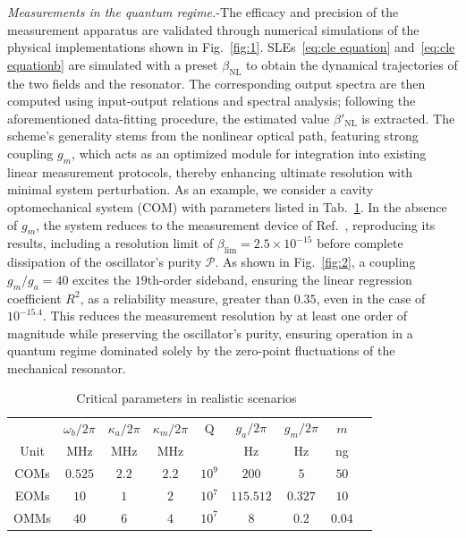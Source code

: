 \documentclass[aps,prl,twocolumn,superscriptaddress]{revtex4-2}
\begin{document}
\textit{Measurements in the quantum regime.}-The efficacy and precision of the measurement apparatus are validated through numerical simulations of the physical implementations shown in Fig.~\ref{fig:1}.  SLEs~\eqref{eq:cle equation} and~\eqref{eq:cle equationb} are simulated with a preset $\beta_{\text{NL}}$ to obtain the dynamical trajectories of the two fields and the resonator. The corresponding output spectra are then computed using input-output relations and spectral analysis; following the aforementioned data-fitting procedure, the estimated value $\beta'_{\text{NL}}$ is extracted. The scheme's generality stems from the nonlinear optical path, featuring strong coupling $g_m$, which acts as an optimized module for integration into existing linear measurement protocols, thereby enhancing ultimate resolution with minimal system perturbation. As an example, we consider a cavity optomechanical system (COM) with parameters listed in Tab.~\ref{table:1}. In the absence of $g_m$, the system reduces to the measurement device of Ref.~\cite{Li2025}, reproducing its results, including a resolution limit of $\beta_{\text{lim}} = 2.5 \times 10^{-15}$ before complete dissipation of the oscillator's purity $\mathcal{P}$. As shown in Fig.~\ref{fig:2}, a coupling $g_m/g_a = 40$ excites the $19$th-order sideband, ensuring the linear regression coefficient $R^2$, as a reliability measure, greater than $0.35$, even in the case of $10^{-15.4}$. This reduces the measurement resolution by at least one order of magnitude while preserving the oscillator's purity, ensuring operation in a quantum regime dominated solely by the zero-point fluctuations of the mechanical resonator.
\begin{table}[]
\caption{Critical parameters in realistic scenarios~\cite{Barzanjeh2015,Heyroth2019, Fan2023,Piergentil2018} \label{table:1}}
\begin{tabular}{c|cccccccc}
\hline
      & $\omega_b/2\pi$&  $\kappa_a/2\pi$ & $\kappa_m/2\pi$   & $\text{Q}$ &   $g_a/2\pi$ &  $g_m/2\pi$ & $m$    \\ 
 Unit& MHz & MHz & MHz  &   &  Hz   & Hz  &ng \\ \hline
COMs& $0.525$ & $2.2$ & $ 2.2$  &  $ 10^9$ &  $ 200$   & $5$  & $50$     \\ 
EOMs& $ 10$ & $ 1$ & $ 2$  &   $10^7$ & $ 115.512$ & $ 0.327$ & $10$  \\
OMMs& $ 40$ & $6$ & $ 4$  &   $10^7$ & $ 8$     & $ 0.2$  & $0.04$         \\    \hline 
\end{tabular}
\end{table}
\end{document}
